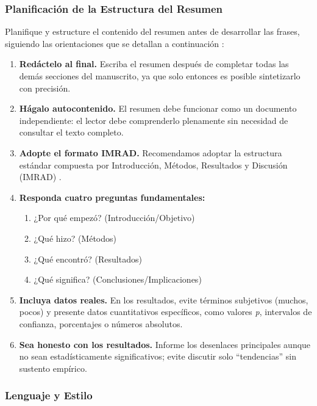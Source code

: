 \documentclass[spanish]{rbie2026}%
\begin{document}
\subsubsection{Planificación de la Estructura del Resumen}

Planifique y estructure el contenido del resumen antes de desarrollar las frases, siguiendo las orientaciones que se detallan a continuación \citep{ecarnort_writing_article_2015}:

\begin{enumerate}
  \item \textbf{Redáctelo al final.} Escriba el resumen después de completar todas las demás secciones del manuscrito, ya que solo entonces es posible sintetizarlo con precisión.

  \item \textbf{Hágalo autocontenido.} El resumen debe funcionar como un documento independiente: el lector debe comprenderlo plenamente sin necesidad de consultar el texto completo.

  \item \textbf{Adopte el formato IMRAD.} Recomendamos adoptar la estructura estándar compuesta por Introducción, Métodos, Resultados y Discusión (IMRAD) \citep{abstract_Nundy2022}.

  \item \textbf{Responda cuatro preguntas fundamentales:}
  \begin{enumerate}
    \item ¿Por qué empezó? (Introducción/Objetivo)
    \item ¿Qué hizo? (Métodos)
    \item ¿Qué encontró? (Resultados)
    \item ¿Qué significa? (Conclusiones/Implicaciones)
  \end{enumerate}

  \item \textbf{Incluya datos reales.} En los resultados, evite términos subjetivos (muchos, pocos) y presente datos cuantitativos específicos, como valores \textit{p}, intervalos de confianza, porcentajes o números absolutos.

  \item \textbf{Sea honesto con los resultados.} Informe los desenlaces principales aunque no sean estadísticamente significativos; evite discutir solo ``tendencias'' sin sustento empírico.
\end{enumerate}


\subsubsection{Lenguaje y Estilo}
\end{document}
